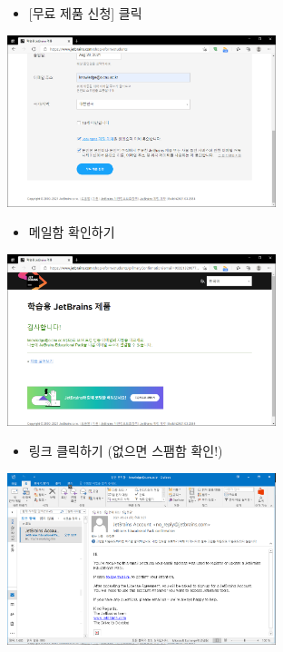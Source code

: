 \documentclass{beamer}
\begin{document}
    \begin{frame}
        \begin{itemize}
            \item {[무료 제품 신청]} 클릭
        \end{itemize}
        \begin{center}
            \includegraphics[height=5cm]{Images/jetbrains-5.png}
        \end{center}
    \end{frame}
    \begin{frame}
        \begin{itemize}
            \item 메일함 확인하기
        \end{itemize}
        \begin{center}
            \includegraphics[height=5cm]{Images/jetbrains-6.png}
        \end{center}
    \end{frame}
    \begin{frame}
        \begin{itemize}
            \item 링크 클릭하기 (없으면 스팸함 확인!)
        \end{itemize}
        \begin{center}
            \includegraphics[height=5cm]{Images/jetbrains-7.png}
        \end{center}
    \end{frame}
\end{document}
